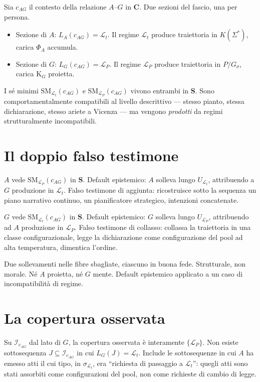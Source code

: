 \documentclass[
    oneside,                 %
    openany,                 %
    titlepage,
    11pt,
    a4paper,
    italian,
    DIV=14,                  %
    headinclude,
    footinclude=true,
    cleardoublepage=empty
]{scrbook}
\theoremstyle{ctplain}
\theoremstyle{ctdef}
\theoremstyle{ctrem}
\newcommand{\Lt}{\mathcal{L}_t}
\newcommand{\LP}{\mathcal{L}_P}
\newcommand{\Phii}{\Phi}
\newcommand{\Kappaa}{\mathrm{K}}
\newcommand{\Gs}{G_{\sigma}}
\newcommand{\KSigma}{K(\Sigma^{*})}
\begin{document}
Sia $c_{AG}$ il contesto della relazione $A$--$G$ in $\mathbf{C}$. Due sezioni del fascio, una per persona.

\begin{itemize}
\item Sezione di $A$: $L_A(c_{AG}) = \Lt$. Il regime $\Lt$ produce traiettoria in $\KSigma$, carica $\Phii_A$ accumula.
\item Sezione di $G$: $L_G(c_{AG}) = \LP$. Il regime $\LP$ produce traiettoria in $P/\Gs$, carica $\Kappaa_G$ proietta.
\end{itemize}

I sé minimi $\mathrm{SM}_{\Lt}(c_{AG})$ e $\mathrm{SM}_{\LP}(c_{AG})$ vivono entrambi in $\mathbf{S}$. Sono comportamentalmente compatibili al livello descrittivo --- stesso pianto, stessa dichiarazione, stesso ariete a Vicenza --- ma vengono \emph{prodotti} da regimi strutturalmente incompatibili.

\section*{Il doppio falso testimone}

$A$ vede $\mathrm{SM}_{\LP}(c_{AG})$ in $\mathbf{S}$. Default epistemico: $A$ solleva lungo $U_{\Lt}$, attribuendo a $G$ produzione in $\Lt$. Falso testimone di aggiunta: ricostruisce sotto la sequenza un piano narrativo continuo, un pianificatore strategico, intenzioni concatenate.

$G$ vede $\mathrm{SM}_{\Lt}(c_{AG})$ in $\mathbf{S}$. Default epistemico: $G$ solleva lungo $U_{\LP}$, attribuendo ad $A$ produzione in $\LP$. Falso testimone di collasso: collassa la traiettoria in una classe configurazionale, legge la dichiarazione come configurazione del pool ad alta temperatura, dimentica l'ordine.

Due sollevamenti nelle fibre sbagliate, ciascuno in buona fede. Strutturale, non morale. Né $A$ proietta, né $G$ mente. Default epistemico applicato a un caso di incompatibilità di regime.

\section*{La copertura osservata}

Su $\mathcal{I}_{c_{AG}}$ dal lato di $G$, la copertura osservata è interamente $\{\LP\}$. Non esiste sottosequenza $J \subseteq \mathcal{I}_{c_{AG}}$ in cui $L_G(J) = \Lt$. Include le sottosequenze in cui $A$ ha emesso atti il cui tipo, in $\sigma_{\Lt}$, era ``richiesta di passaggio a $\Lt$'': quegli atti sono stati assorbiti come configurazioni del pool, non come richieste di cambio di legge.
\end{document}
